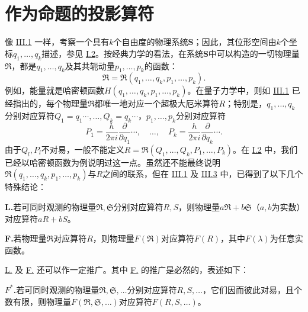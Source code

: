\documentclass[fontsize=13pt,twoside,openany,headings=normal,parskip=false,bookmarkpackage=false,DIV=calc]{scrbook}
\begin{document}
\section{作为命题的投影算符}\label{sec:III.5}
像 \hyperref[sec:III.1]{III.1} 一样，考察一个具有$k$个自由度的物理系统$\boldsymbol{S}$；因此，其位形空间由$k$个坐标$q_1,\allowbreak \ldots,\allowbreak q_k$描述，参见 \hyperref[sec:I.2]{I.2}。按经典力学的看法，在系统$\boldsymbol{S}$中可以构造的一切物理量$\mathfrak R$，都是$q_1,\allowbreak \ldots,\allowbreak q_k$及其共轭动量$p_1,\allowbreak \ldots,\allowbreak p_k$的函数：
\[
\mathfrak R=\mathfrak R(q_1,\ldots,q_k,p_1,\ldots,p_k).
\]
例如，能量就是哈密顿函数$H(q_1,\allowbreak \ldots,\allowbreak q_k,\allowbreak p_1,\allowbreak \ldots,\allowbreak p_k)$。在量子力学中，则如 \hyperref[sec:III.1]{III.1} 已经指出的，每个物理量$\mathfrak R$都唯一地对应一个超极大厄米算符$R$；特别是，$q_1,\allowbreak \ldots,\allowbreak q_k$分别对应算符$Q_1=q_1\cdots,\allowbreak \ldots,\allowbreak Q_k=q_k\cdots$，$p_1,\allowbreak \ldots,\allowbreak p_k$分别对应算符
\[
P_1=\frac h{2\pi i}\frac\partial{\partial q_1}\cdots,\quad\ldots,\quad
P_k=\frac h{2\pi i}\frac\partial{\partial q_k}\cdots.
\]
由于$Q_l,\allowbreak P_l$不对易，一般不能定义$R=\mathfrak R(Q_1,\allowbreak \ldots,\allowbreak Q_k,\allowbreak P_1,\allowbreak \ldots,\allowbreak P_k)$。在 \hyperref[sec:I.2]{I.2} 中，我们已经以哈密顿函数为例说明过这一点。虽然还不能最终说明$\mathfrak R(q_1,\allowbreak \ldots,\allowbreak q_k,\allowbreak p_1,\allowbreak \ldots,\allowbreak p_k)$与$R$之间的联系，但在 \hyperref[sec:III.1]{III.1} 及 \hyperref[sec:III.3]{III.3} 中，已得到了以下几个特殊结论：

\leavevmode{}\label{post:III.5.L}\textbf{L.}若可同时观测的物理量$\mathfrak R,\allowbreak \mathfrak S$分别对应算符$R,\allowbreak S$，则物理量$a\mathfrak R+b\mathfrak S$（$a,\allowbreak b$为实数）对应算符$aR+bS$。

\hypertarget{origpage-131}{}\label{origpage-131}\leavevmode{}\label{post:III.5.F}\textbf{F.}若物理量$\mathfrak R$对应算符$R$，则物理量$F(\mathfrak R)$对应算符$F(R)$，其中$F(\lambda)$为任意实函数。

\hyperref[post:III.5.L]{L.} 及 \hyperref[post:III.5.F]{F.} 还可以作一定推广。其中 \hyperref[post:III.5.F]{F.} 的推广是必然的，表述如下：

\leavevmode{}\label{post:III.5.Fstar}\textbf{$F^*$.}若可同时观测的物理量$\mathfrak R,\allowbreak \mathfrak S,\allowbreak \ldots$分别对应算符$R,\allowbreak S,\allowbreak \ldots$，它们因而彼此对易，且个数有限，则物理量$F(\mathfrak R,\allowbreak \mathfrak S,\allowbreak \ldots)$对应算符$F(R,\allowbreak S,\allowbreak \ldots)$。
\end{document}
